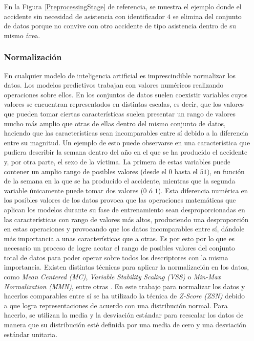 En la Figura \ref{PreprocessingStage} de referencia, se muestra el ejemplo donde el accidente sin necesidad de asistencia con identificador $4$ se elimina del conjunto de datos porque no convive con otro accidente de tipo asistencia dentro de su mismo área.


\subsubsection{Normalización}

En cualquier modelo de inteligencia artificial es imprescindible normalizar los datos. Los modelos predictivos trabajan con valores numéricos realizando operaciones sobre ellos. En los conjuntos de datos suelen coexistir variables cuyos valores se encuentran representados en distintas escalas, es decir, que los valores que pueden tomar ciertas características suelen presentar un rango de valores mucho más amplio que otras de ellas dentro del mismo conjunto de datos, haciendo que las características sean incomparables entre sí debido a la diferencia entre su magnitud. Un ejemplo de esto puede observarse en una característica que pudiera describir la semana dentro del año en el que se ha producido el accidente y, por otra parte, el sexo de la víctima. La primera de estas variables puede contener un amplio rango de posibles valores (desde el $0$ hasta el $51$), en función de la semana en la que se ha producido el accidente, mientras que la segunda variable únicamente puede tomar dos valores ($0$ ó $1$). Esta diferencia numérica en los posibles valores de los datos provoca que las operaciones matemáticas que aplican los modelos durante su fase de entrenamiento sean desproporcionadas en las características con rango de valores más altos, produciendo una desproporción en estas operaciones y provocando que los datos incomparables entre sí, dándole más importancia a unas características que a otras. Es por esto por lo que es necesario un proceso de logre acotar el rango de posibles valores del conjunto total de datos para poder operar sobre todos los descriptores con la misma importancia. Existen distintas técnicas para aplicar la normalización en los datos, como \textit{Mean Centered (MC)}, \textit{Variable Stability Scaling (VSS)} o \textit{Min-Max Normalization (MMN)}, entre otras \cite{DataNormalizationInvestigation}. En este trabajo para normalizar los datos y hacerlos comparables entre sí se ha utilizado la técnica de \textit{Z-Score (ZSN)} debido a que logra representaciones de acuerdo con una distribución normal. Para hacerlo, se utilizan la media y la desviación estándar para reescalar los datos de manera que su distribución esté definida por una media de cero y una desviación estándar unitaria.

